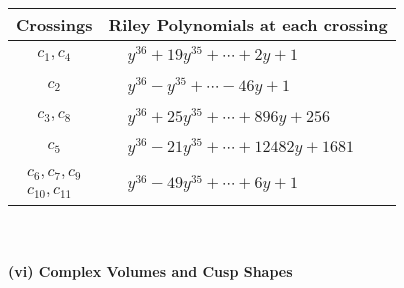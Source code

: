 \documentclass[1p]{elsarticle_modified}
\theoremstyle{definition}
\begin{document}
\begin{tabular}{m{50pt}|m{274pt}}
Crossings & \hspace{64pt}Riley Polynomials at each crossing \\
\hline $$\begin{aligned}c_{1},c_{4}\end{aligned}$$&$\begin{aligned}
&y^{36}+19 y^{35}+\cdots+2 y+1
\end{aligned}$\\
\hline $$\begin{aligned}c_{2}\end{aligned}$$&$\begin{aligned}
&y^{36}- y^{35}+\cdots-46 y+1
\end{aligned}$\\
\hline $$\begin{aligned}c_{3},c_{8}\end{aligned}$$&$\begin{aligned}
&y^{36}+25 y^{35}+\cdots+896 y+256
\end{aligned}$\\
\hline $$\begin{aligned}c_{5}\end{aligned}$$&$\begin{aligned}
&y^{36}-21 y^{35}+\cdots+12482 y+1681
\end{aligned}$\\
\hline $$\begin{aligned}c_{6},c_{7},c_{9}\\c_{10},c_{11}\end{aligned}$$&$\begin{aligned}
&y^{36}-49 y^{35}+\cdots+6 y+1
\end{aligned}$\\
\hline
\end{tabular}\\~\\
\newpage\flushleft \textbf{(vi) Complex Volumes and Cusp Shapes}
\end{document}
